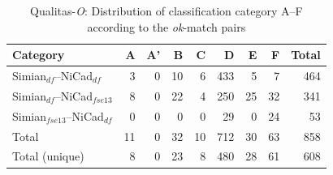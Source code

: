 \documentclass{IEEEtran}
\begin{document}
\begin{table}[H]
	\centering
	\caption{Qualitas-\textit{O}: Distribution of classification category A--F  according to the \textit{ok}-match pairs}
	\label{tab:ok_classification}
	\begin{tabular}{|l|r|r|r|r|r|r|r|r|}
		\hline 
		Category   																										& A   	& 	A' 	& 	B  & C	   & D   	&	E   &	F   & Total  \\
		\hline
		Simian$_{df}$--NiCad$_{df}$        & 3 	& 0 	& 10	& 6 	& 433  & 5	& 7  &  464 \\
		Simian$_{df}$--NiCad$_{fse13}$   									& 8 	& 0 	& 22	& 4	& 250 & 25  & 32 &  341 \\
		Simian$_{fse13}$--NiCad$_{df}$   									& 0 	& 0 	& 0 	& 0 	 & 29 	  & 0 		& 24 	& 53 \\
		\hline
		Total   &   11  &   0   &  32   &  10   &   712   &   30   & 63  & 858 \\
		Total (unique)  &   8  &   0   &  23   &  8   &  480  &  28  & 61  & 608 \\
		\hline
	\end{tabular} 
\end{table}

%
\end{document}
